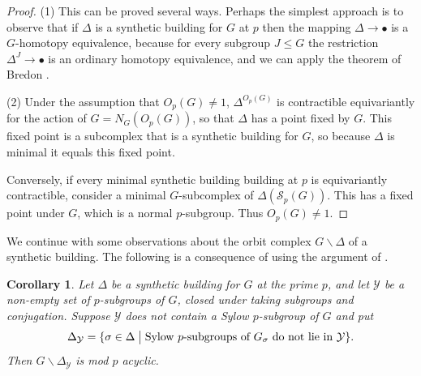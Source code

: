 \documentclass[12pt]{amsart}
\theoremstyle{plain}
\newtheorem{corollary}[theorem]{Corollary}
\theoremstyle{definition}
\theoremstyle{remark}
\numberwithin{equation}{section}
\def\calY{{\mathcal Y}}
\newcommand{\SpCpx}[2]{\Delta(\mathcal{S}_{#2}(#1))}
\begin{document}
\begin{proof} (1) This can be proved several ways. Perhaps the simplest approach is to observe that if $\Delta$ is a synthetic building for $G$ at $p$ then the mapping $\Delta\to\bullet$ is a $G$-homotopy equivalence, because for every subgroup  $J\le G$ the restriction $\Delta^J\to \bullet$ is an ordinary homotopy equivalence, and we can apply the theorem of Bredon \cite[Sect. II]{Bre1967}.

(2) Under the assumption that $O_p(G)\ne 1$, $\Delta^{O_p(G)}$ is contractible equivariantly for the action of $G = N_G(O_p(G))$, so that $\Delta$ has a point fixed by $G$. This fixed point is a subcomplex that is a synthetic building for $G$, so because $\Delta$ is minimal it equals this fixed point.

Conversely, if every minimal synthetic building building at $p$ is equivariantly contractible, consider a minimal $G$-subcomplex of $\SpCpx{G}{p}$. This has a fixed point under $G$, which is a normal $p$-subgroup. Thus $O_p(G)\ne 1$. 
\end{proof}

We continue with some observations about the orbit complex $G\backslash\Delta$ of a synthetic building. The following is a consequence of  \cite[Thm. A]{Web1991} using the argument of \cite[Cor. 2.6.1]{Web1991}.

\begin{corollary}
\label{orbit-space-mod-p-acyclic-corollary}
Let $\Delta$ be a synthetic building for $G$ at the prime $p$, and let $\calY$ be a non-empty set of $p$-subgroups of $G$, closed under taking subgroups and conjugation. Suppose $\calY$ does not contain a Sylow $p$-subgroup of $G$ and put 
$$
\Delta_\calY = \{\sigma \in \Delta\bigm| \hbox{Sylow $p$-subgroups of } G_\sigma \hbox{ do not lie in } \calY\}.
$$
Then $G\backslash \Delta_\calY$ is mod $p$ acyclic.
\end{corollary}
\end{document}
